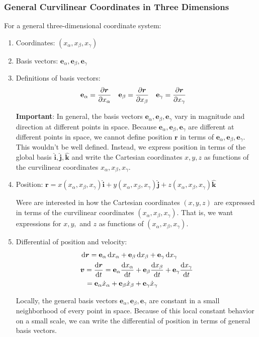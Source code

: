 \documentclass[11pt, a4paper]{article}
\newcommand{\diff}{\mathop{}\!\mathrm{d}} %
\newcommand{\e}{\mathbf{e}} %
\newcommand{\uvec}[1]{\bm{\hat{\mathbf{#1}}}} %
\begin{document}
\subsubsection{General Curvilinear Coordinates in Three Dimensions}
For a general three-dimensional coordinate system:
\begin{enumerate}	
	\item Coordinates: $ (x_{\alpha}, x_{\beta}, x_{\gamma}) $
	\item Basis vectors: $ \e_{\alpha} ,  \e_{\beta},  \e_{\gamma} $
	
	\item Definitions of basis vectors:
	\begin{align*}
		& \e_{\alpha} = \pdv{\bm{r}}{x_{\alpha}} && \e_{\beta} = \pdv{\bm{r}}{x_{\beta}} && \e_{\gamma} = \pdv{\bm{r}}{x_{\gamma}}
	\end{align*}
	
	\textbf{Important}: In general, the basis vectors $ \e_{\alpha} ,  \e_{\beta},  \e_{\gamma} $ vary in magnitude and direction at different points in space. Because $ \e_{\alpha} ,  \e_{\beta},  \e_{\gamma} $ are different at different points in space, we cannot define position $ \bm{r} $ in terms of $ \e_{\alpha} ,  \e_{\beta},  \e_{\gamma} $. This wouldn't be well defined. Instead, we express position in terms of the global basis $ \uvec i, \uvec j, \uvec k $ and write the Cartesian coordinates $ x, y, z $ as functions of the curvilinear coordinates $ x_{\alpha}, x_{\beta}, x_{\gamma} $. 

	\item Position: $ \bm{r} = x(x_{\alpha}, x_{\beta}, x_{\gamma}) \uvec i + y(x_{\alpha}, x_{\beta}, x_{\gamma}) \uvec j + z(x_{\alpha}, x_{\beta}, x_{\gamma}) \uvec{k} $
	
	Were are interested in how the Cartesian coordinates $ (x, y, z) $ are expressed in terms of the curvilinear coordinates $ (x_{\alpha}, x_{\beta}, x_{\gamma}) $. That is, we want expressions for $ x, y, $ and $ z $ as functions of $ (x_{\alpha}, x_{\beta}, x_{\gamma}) $.
	\item Differential of position and velocity:
	\begin{align*}
		&\diff \bm{r} = \e_{\alpha} \diff x_{\alpha} + \e_{\beta} \diff x_{\beta} +  \e_{\gamma} \diff x_{\gamma}\\
		&\bm{v} = \dv{\bm{r}}{t} =  \e_{\alpha} \dv{x_{\alpha}}{t} + \e_{\beta} \dv{x_{\beta}}{t} +  \e_{\gamma}  \dv{x_{\gamma}}{t} \\
		&\ \ = \e_{\alpha} \dot{x}_{\alpha} + \e_{\beta}\dot{x}_{\beta}  +  \e_{\gamma} \dot{x}_{\gamma} 
	\end{align*}
	
	Locally, the general basis vectors $ \e_{\alpha} ,  \e_{\beta},  \e_{\gamma} $ are constant in a small neighborhood of every point in space. Because of this local constant behavior on a small scale, we can write the differential of position in terms of general basis vectors.
	
\end{enumerate}
\end{document}
